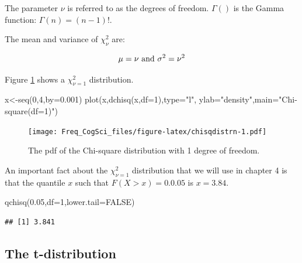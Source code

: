 \documentclass[
  12pt,
]{krantz}
\newenvironment{Shaded}{\begin{snugshade}}{\end{snugshade}}
\newcommand{\AttributeTok}[1]{\textcolor[rgb]{0.77,0.63,0.00}{#1}}
\newcommand{\ConstantTok}[1]{\textcolor[rgb]{0.00,0.00,0.00}{#1}}
\newcommand{\DecValTok}[1]{\textcolor[rgb]{0.00,0.00,0.81}{#1}}
\newcommand{\FloatTok}[1]{\textcolor[rgb]{0.00,0.00,0.81}{#1}}
\newcommand{\FunctionTok}[1]{\textcolor[rgb]{0.00,0.00,0.00}{#1}}
\newcommand{\NormalTok}[1]{#1}
\newcommand{\OtherTok}[1]{\textcolor[rgb]{0.56,0.35,0.01}{#1}}
\newcommand{\StringTok}[1]{\textcolor[rgb]{0.31,0.60,0.02}{#1}}
\theoremstyle{definition}
\theoremstyle{definition}
\theoremstyle{definition}
\theoremstyle{definition}
\theoremstyle{remark}
\begin{document}
The parameter \(\nu\) is referred to as the degrees of freedom. \(\Gamma()\) is the Gamma function: \(\Gamma(n)=(n-1)!\).

The mean and variance of \(\chi^2_{\nu}\) are:

\begin{equation}
\mu = \nu \hbox{  and  }  
\sigma^2 = \nu^2
\end{equation}

Figure \ref{fig:chisqdistrn} shows a \(\chi^2_{\nu=1}\) distribution.

\begin{Shaded}
\begin{Highlighting}[]
\NormalTok{x}\OtherTok{\textless{}{-}}\FunctionTok{seq}\NormalTok{(}\DecValTok{0}\NormalTok{,}\DecValTok{4}\NormalTok{,}\AttributeTok{by=}\FloatTok{0.001}\NormalTok{)}
\FunctionTok{plot}\NormalTok{(x,}\FunctionTok{dchisq}\NormalTok{(x,}\AttributeTok{df=}\DecValTok{1}\NormalTok{),}\AttributeTok{type=}\StringTok{"l"}\NormalTok{,}
     \AttributeTok{ylab=}\StringTok{"density"}\NormalTok{,}\AttributeTok{main=}\StringTok{"Chi{-}square(df=1)"}\NormalTok{)}
\end{Highlighting}
\end{Shaded}

\begin{figure}
\centering
\texttt{[image: Freq\_CogSci\_files/figure-latex/chisqdistrn-1.pdf]}
\caption{\label{fig:chisqdistrn}The pdf of the Chi-square distribution with 1 degree of freedom.}
\end{figure}

An important fact about the \(\chi^2_{\nu=1}\) distribution that we will use in chapter 4 is that the quantile \(x\) such that \(F(X>x)=0.0.05\) is \(x=3.84\).

\begin{Shaded}
\begin{Highlighting}[]
\FunctionTok{qchisq}\NormalTok{(}\FloatTok{0.05}\NormalTok{,}\AttributeTok{df=}\DecValTok{1}\NormalTok{,}\AttributeTok{lower.tail=}\ConstantTok{FALSE}\NormalTok{)}
\end{Highlighting}
\end{Shaded}

\begin{verbatim}
## [1] 3.841
\end{verbatim}

\hypertarget{the-t-distribution}{%
\subsection{The t-distribution}\label{the-t-distribution}}
\end{document}
